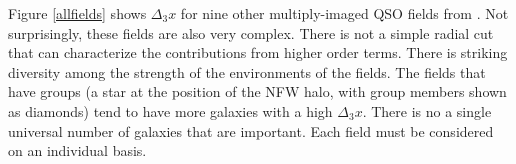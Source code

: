 Figure \ref{allfields} shows $\Delta_3 x$ for nine other multiply-imaged QSO fields from \citet{Wong11}. Not surprisingly, these fields are also very complex. There is not a simple radial cut that can characterize the contributions from higher order terms. There is striking diversity among the strength of the environments of the fields. The fields that have groups (a star at the position of the NFW halo, with group members shown as diamonds) tend to have more galaxies with a high $\Delta_3 x$. There is no a single universal number of galaxies that are important. Each field must be considered on an individual basis.
  